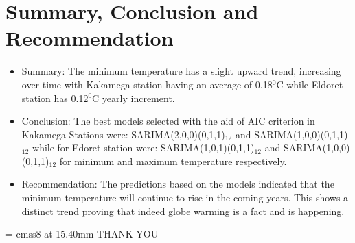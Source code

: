 \documentclass[]{beamer}
\begin{document}
\section{Summary, Conclusion and Recommendation}
\begin{frame}
\begin{itemize}
	\item Summary:
The minimum temperature has a slight upward trend, increasing over time with Kakamega station having an average of 0.18$^{0}$C while Eldoret station has 0.12$^{0}$C yearly increment.	
	\item Conclusion:
The best models selected with the aid of AIC criterion in Kakamega Stations were: SARIMA(2,0,0)(0,1,1)$_{12}$ and SARIMA(1,0,0)(0,1,1)$_{12}$ while for Edoret station were: SARIMA(1,0,1)(0,1,1)$_{12}$ and SARIMA(1,0,0)(0,1,1)$_{12}$ for minimum and maximum temperature respectively.
	\item Recommendation:
The predictions based on the models indicated that the minimum temperature will continue to rise in the coming years. This shows a distinct trend proving that indeed globe warming is a fact and is happening. 		
\end{itemize}
\end{frame}
\printbibliography
\begin{frame}
	 \begin{center}
			\font\endfont = cmss8 at 15.40mm
			\endfont 
			\baselineskip 20.0mm 
		THANK YOU
\end{center}
\end{frame}
\end{document}
